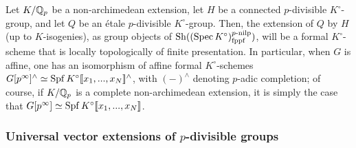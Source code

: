             \begin{corollary} \label{coro: extensions_of_etale_p_divisible_groups_by_connected_p_divisible_groups}
                Let $K/\mathbb{Q}_p$ be a non-archimedean extension, let $H$ be a connected $p$-divisible $K^{\circ}$-group, and let $Q$ be an \'etale $p$-divisible $K^{\circ}$-group. Then, the extension of $Q$ by $H$ (up to $K$-isogenies), as group objects of $\mathrm{Sh}((\operatorname{Spec} K^{\circ})_{\mathrm{fppf}}^{p\text{-}\mathrm{nilp}})$, will be a formal $K^{\circ}$-scheme that is locally topologically of finite presentation. In particular, when $G$ is affine, one has an isomorphism of affine formal $K^{\circ}$-schemes $G[p^{\infty}]^{\wedge} \simeq \operatorname{Spf} K^{\circ}[\![x_1, ..., x_N]\!]^{\wedge}$, with $(-)^{\wedge}$ denoting $p$-adic completion; of course, if $K/\mathbb{Q}_p$ is a complete non-archimedean extension, it is simply the case that $G[p^{\infty}] \simeq \operatorname{Spf} K^{\circ}[\![x_1, ..., x_N]\!]$.
            \end{corollary}
                
        \subsubsection{Universal vector extensions of \texorpdfstring{$p$}{}-divisible groups}
        
